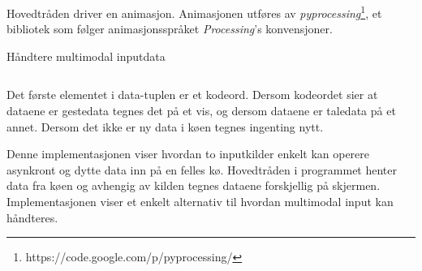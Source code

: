 Hovedtråden driver en animasjon. Animasjonen utføres av \emph{pyprocessing}\footnote{https://code.google.com/p/pyprocessing/}, et bibliotek som følger animasjonsspråket \emph{Processing}'s konvensjoner.
\begin{listing}[ht]
\caption{Håndtere multimodal inputdata}
\inputminted[fontsize=\footnotesize, linenos]{python}{kodesnutter/multimodal.py}
\label{code:multimodal}
\end{listing}
Det første elementet i data-tuplen er et kodeord. Dersom kodeordet sier at dataene er gestedata tegnes det på et vis, og dersom dataene er taledata på et annet. Dersom det ikke er ny data i køen tegnes ingenting nytt.

Denne implementasjonen viser hvordan to inputkilder enkelt kan operere asynkront og dytte data inn på en felles kø. Hovedtråden i programmet henter data fra køen og avhengig av kilden tegnes dataene forskjellig på skjermen. Implementasjonen viser et enkelt alternativ til hvordan multimodal input kan håndteres.

